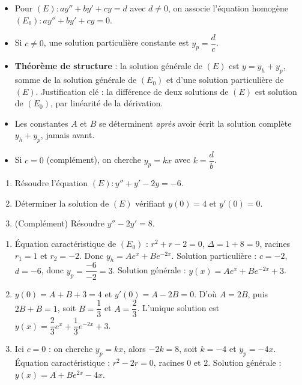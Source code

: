 \documentclass[11pt]{article}
\begin{document}
\begin{aretenir}
\begin{itemize}
\item Pour $(E) : ay'' + by' + cy = d$ avec $d \neq 0$, on associe l'équation homogène $(E_0) : ay'' + by' + cy = 0$.
\item Si $c \neq 0$, une solution particulière constante est $y_p = \dfrac{d}{c}$.
\item \textbf{Théorème de structure} : la solution générale de $(E)$ est $y = y_h + y_p$, somme de la solution générale de $(E_0)$ et d'une solution particulière de $(E)$. Justification clé : la différence de deux solutions de $(E)$ est solution de $(E_0)$, par linéarité de la dérivation.
\item Les constantes $A$ et $B$ se déterminent \emph{après} avoir écrit la solution complète $y_h + y_p$, jamais avant.
\item Si $c = 0$ (complément), on cherche $y_p = kx$ avec $k = \dfrac{d}{b}$.
\end{itemize}
\end{aretenir}

\begin{exercice}
\begin{enumerate}
\item Résoudre l'équation $(E) : y'' + y' - 2y = -6$.
\item Déterminer la solution de $(E)$ vérifiant $y(0) = 4$ et $y'(0) = 0$.
\item (Complément) Résoudre $y'' - 2y' = 8$.
\end{enumerate}
\end{exercice}

\begin{corrige}[Exercice]
\begin{enumerate}
\item Équation caractéristique de $(E_0)$ : $r^2 + r - 2 = 0$, $\Delta = 1 + 8 = 9$, racines $r_1 = 1$ et $r_2 = -2$. Donc $y_h = Ae^x + Be^{-2x}$. Solution particulière : $c = -2$, $d = -6$, donc $y_p = \dfrac{-6}{-2} = 3$. Solution générale : $y(x) = Ae^x + Be^{-2x} + 3$.
\item $y(0) = A + B + 3 = 4$ et $y'(0) = A - 2B = 0$. D'où $A = 2B$, puis $2B + B = 1$, soit $B = \dfrac{1}{3}$ et $A = \dfrac{2}{3}$. L'unique solution est $y(x) = \dfrac{2}{3}e^x + \dfrac{1}{3}e^{-2x} + 3$.
\item Ici $c = 0$ : on cherche $y_p = kx$, alors $-2k = 8$, soit $k = -4$ et $y_p = -4x$. Équation caractéristique : $r^2 - 2r = 0$, racines $0$ et $2$. Solution générale : $y(x) = A + Be^{2x} - 4x$.
\end{enumerate}
\end{corrige}
\end{document}
